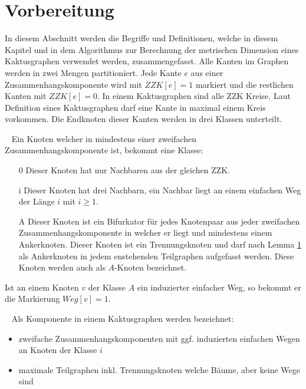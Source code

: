 \section{Vorbereitung}
\vspace{-4mm}
In diesem Abschnitt werden die Begriffe und Definitionen, welche in diesem Kapitel und in dem Algorithmus zur Berechnung der metrischen Dimension eines Kaktusgraphen verwendet werden, zusammengefasst.
\newline
Alle Kanten im Graphen werden in zwei Mengen partitioniert. Jede Kante $e$ aus einer Zusammenhangskomponente wird mit $ZZK[e]=1$ markiert und die restlichen Kanten mit $ZZK[e]=0$.
In einem Kaktusgraphen sind alle ZZK Kreise. Laut Definition eines Kaktusgraphen darf eine Kante in maximal einem Kreis vorkommen. Die Endknoten dieser Kanten werden in drei Klassen unterteilt.
\begin{defi}~\newline
Ein Knoten welcher in mindestens einer zweifachen Zusammenhangskomponente ist, bekommt eine Klasse:
\begin{itemize}
\item[0] Dieser Knoten hat nur Nachbaren aus der gleichen ZZK.
\item[i] Dieser Knoten hat drei Nachbarn, ein Nachbar liegt an einem einfachen Weg der Länge $i$ mit $i \geq 1$.
\item[A] Dieser Knoten ist ein Bifurkator für jedes Knotenpaar aus jeder zweifachen Zusammenhangskomponente in welcher er liegt und mindestens einem Ankerknoten. Dieser Knoten ist ein Trennungsknoten und darf nach Lemma \ref{} als Ankerknoten in jedem enstehenden Teilgraphen aufgefasst werden. Diese Knoten werden auch als $A$-Knoten bezeichnet.
\end{itemize}
\end{defi}
Ist an einem Knoten $v$ der Klasse $A$ ein induzierter einfacher Weg, so bekommt er die Markierung $Weg[v]=1$.
\begin{defi}[Komponente]~\newline
Als Komponente in einem Kaktusgraphen werden bezeichnet:
\begin{itemize}
\item zweifache Zusammenhangskomponenten mit ggf. induzierten einfachen Wegen an Knoten der Klasse $i$
\item maximale Teilgraphen inkl. Trennungsknoten welche Bäume, aber keine Wege sind 
\end{itemize}
\end{defi}
